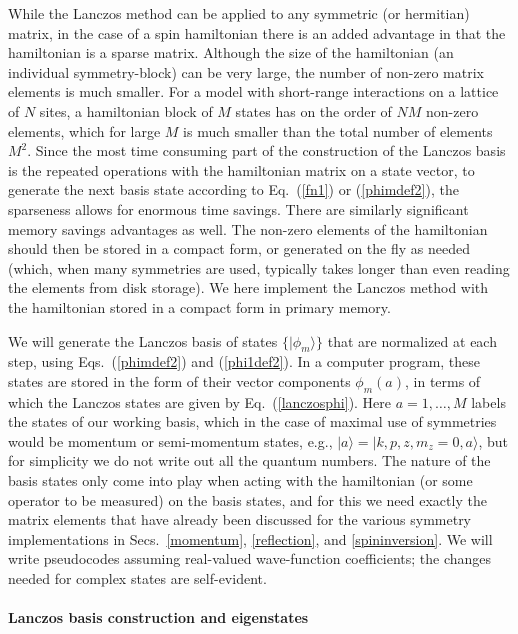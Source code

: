 \documentclass[draft,numberedheadings]{aipproc}
\begin{document}
While the Lanczos method can be applied to any symmetric (or hermitian) matrix, in the case of a spin hamiltonian there is an added advantage in that
the hamiltonian is a sparse matrix. Although the size of the hamiltonian (an individual symmetry-block) can be very large, the number of non-zero 
matrix elements is much smaller. For a model with short-range interactions on a lattice of $N$ sites, a hamiltonian block of $M$ states has on the order of 
$NM$ non-zero elements, which for large $M$ is much smaller than the total number of elements $M^2$. Since the most time consuming part of the construction 
of the Lanczos basis is the repeated operations with the hamiltonian matrix on a state vector, to generate the next basis state according to Eq.~(\ref{fn1}) or
(\ref{phimdef2}), the sparseness allows for enormous time savings. There are similarly significant memory savings advantages as well. The non-zero elements
of the hamiltonian should then be stored in a compact form, or generated on the fly as needed (which, when many symmetries are used, typically takes 
longer than even reading the elements from disk storage). We here implement the Lanczos method with the hamiltonian stored in a compact form in primary 
memory. 

We will generate the Lanczos basis of states $\{|\phi_m\rangle\}$ that are normalized at each step, using Eqs.~(\ref{phimdef2}) and (\ref{phi1def2}). 
In a computer program, these states are stored in the form of their vector components $\phi_m(a)$, in terms of which the Lanczos states are given by 
Eq.~(\ref{lanczosphi}). Here $a=1,\ldots,M$ labels the states of our working basis, which in the case of maximal use of symmetries would be momentum or 
semi-momentum states, e.g., $|a\rangle = |k,p,z,m_z=0,a\rangle$, but for simplicity we do not write out all the quantum numbers. The nature of the
basis states only come into play when acting with the hamiltonian (or some operator to be measured) on the basis states, and for this we need exactly
the matrix elements that have already been discussed for the various symmetry implementations in Secs.~\ref{momentum}, \ref{reflection}, and 
\ref{spininversion}. We will write pseudocodes assuming real-valued wave-function coefficients; the changes needed for complex states 
are self-evident. 

\paragraph{Lanczos basis construction and eigenstates}
\end{document}
